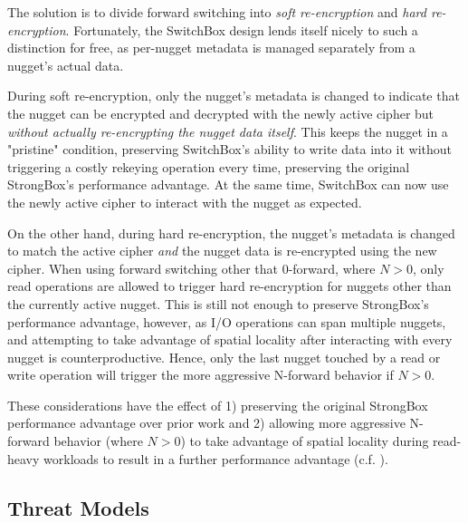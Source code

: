 The solution is to divide forward switching into \emph{soft re-encryption} and
\emph{hard re-encryption}. Fortunately, the SwitchBox design lends itself nicely
to such a distinction for free, as per-nugget metadata is managed separately
from a nugget's actual data.

During soft re-encryption, only the nugget's metadata is changed to indicate
that the nugget can be encrypted and decrypted with the newly active cipher but
\emph{without actually re-encrypting the nugget data itself}. This keeps the
nugget in a "pristine" condition, preserving SwitchBox's ability to write data
into it without triggering a costly rekeying operation every time, preserving
the original StrongBox's performance advantage. At the same time, SwitchBox can
now use the newly active cipher to interact with the nugget as expected.

On the other hand, during hard re-encryption, the nugget's metadata is changed
to match the active cipher \emph{and} the nugget data is re-encrypted using the
new cipher. When using forward switching other that 0-forward, 
where $N > 0$, only read operations are allowed to trigger hard re-encryption
for nuggets other than the currently active nugget. This is still not enough to
preserve StrongBox's performance advantage, however, as I/O operations can span
multiple nuggets, and attempting to take advantage of spatial locality after
interacting with every nugget is counterproductive. Hence, only the last nugget
touched by a read or write operation will trigger the more aggressive N-forward
behavior if $N > 0$.

These considerations have the effect of 1) preserving the original StrongBox
performance advantage over prior work and 2) allowing more aggressive N-forward
behavior (where $N > 0$) to take advantage of spatial locality during read-heavy
workloads to result in a further performance advantage (c.f.
).

\subsection{Threat Models}

